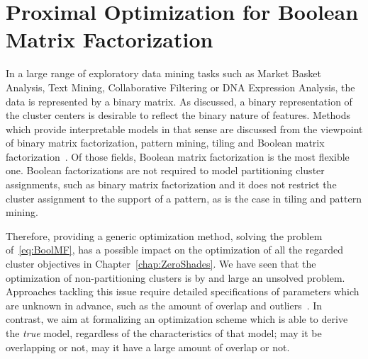 \chapter{Proximal Optimization for Boolean Matrix Factorization}
\label{chap:PALMB}
In a large range of exploratory data mining tasks such as Market Basket Analysis, Text Mining, Collaborative Filtering or DNA Expression Analysis, the data is represented by a binary matrix. As  discussed, a binary representation of the cluster centers is desirable to reflect the binary nature of features. Methods which provide interpretable models in that sense are discussed from the viewpoint of binary matrix factorization, pattern mining, tiling and Boolean matrix factorization~\citep{tatti2012comparing,zimek2015blind}. Of those fields, Boolean matrix factorization is the most flexible one. Boolean factorizations are not required to model partitioning cluster assignments, such as binary matrix factorization and it does not restrict the cluster assignment to the support of a pattern, as is the case in tiling and pattern mining. 
 
Therefore, providing a generic optimization method, solving the problem of~\ref{eq:BoolMF}, has a possible impact on the optimization of all the regarded cluster objectives in Chapter~\ref{chap:ZeroShades}. We have seen that the optimization of non-partitioning clusters is by and large an unsolved problem. Approaches tackling this issue require detailed specifications of parameters which are unknown in advance, such as the amount of overlap and outliers~\citep{whang2017nonCo}. In contrast, we aim at formalizing an optimization scheme which is able to derive the \emph{true} model, regardless of the characteristics of that model; may it be overlapping or not, may it have a large amount of overlap or not. 

